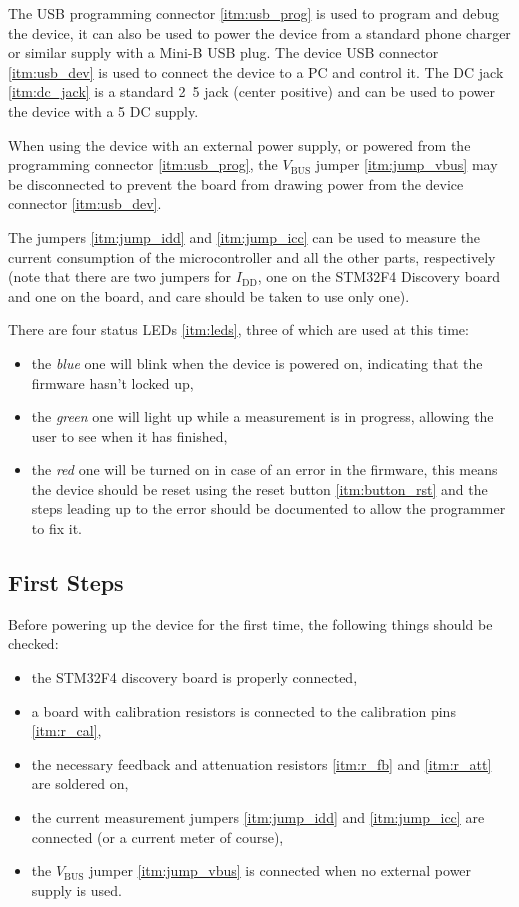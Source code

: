 The USB programming connector \ref{itm:usb_prog} is used to program and debug the device, it can also be used to power
the device from a standard phone charger or similar supply with a Mini-B USB plug.
The device USB connector \ref{itm:usb_dev} is used to connect the device to a PC and control it.
The DC jack \ref{itm:dc_jack} is a standard \unit{2.5}{\milli\meter} jack (center positive) and can be used to
power the device with a \unit{5}{\volt} DC supply.

When using the device with an external power supply, or powered from the programming connector \ref{itm:usb_prog},
the $ V_\text{BUS} $ jumper \ref{itm:jump_vbus} may be disconnected to prevent the board from drawing power from the
device connector \ref{itm:usb_dev}.

The jumpers \ref{itm:jump_idd} and \ref{itm:jump_icc} can be used to measure the current consumption of the
microcontroller and all the other parts, respectively (note that there are two jumpers for $ I_\text{DD} $,
one on the STM32F4 Discovery board and one on the board, and care should be taken to use only one).

There are four status LEDs \ref{itm:leds}, three of which are used at this time:
\begin{itemize}
	\item the \emph{blue} one will blink when the device is powered on, indicating that the firmware hasn't locked up,
  \item the \emph{green} one will light up while a measurement is in progress, allowing the user to see when it has
    finished,
  \item the \emph{red} one will be turned on in case of an error in the firmware, this means the device should be reset
    using the reset button \ref{itm:button_rst} and the steps leading up to the error should be documented to allow
    the programmer to fix it.
\end{itemize}

\subsection{First Steps}

Before powering up the device for the first time, the following things should be checked:
\begin{itemize}
	\item the STM32F4 discovery board is properly connected,
  \item a board with calibration resistors is connected to the calibration pins \ref{itm:r_cal},
  \item the necessary feedback and attenuation resistors \ref{itm:r_fb} and \ref{itm:r_att} are soldered on,
  \item the current measurement jumpers \ref{itm:jump_idd} and \ref{itm:jump_icc} are connected
    (or a current meter of course),
  \item the $ V_\text{BUS} $ jumper \ref{itm:jump_vbus} is connected when no external power supply is used.
\end{itemize}